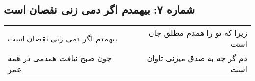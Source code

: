 \begin{center}
\section*{شماره ۷: بیهمدم اگر دمی زنی نقصان است}
\label{sec:007}
\begin{longtable}{l p{0.5cm} r}
بیهمدم اگر دمی زنی نقصان است
&&
زیرا که تو را همدم مطلق جان است
\\
چون صبح نیافت همدمی در همه عمر
&&
دم گر چه به صدق میزنی تاوان است
\\
\end{longtable}
\end{center}
